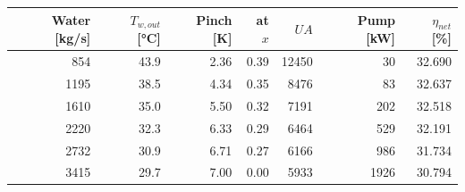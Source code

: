 \begin{tabular}{@{}rrrrrrr@{}}
\toprule
Water [kg/s] & $T_{w,out}$ [\si{\celsius}] & Pinch [K] & at $x$ & $UA$ & Pump [kW] & $\eta_{net}$ [\%] \\
\midrule
854 & 43.9 & 2.36 & 0.39 & 12450 & 30 & 32.690 \\
1195 & 38.5 & 4.34 & 0.35 & 8476 & 83 & 32.637 \\
1610 & 35.0 & 5.50 & 0.32 & 7191 & 202 & 32.518 \\
2220 & 32.3 & 6.33 & 0.29 & 6464 & 529 & 32.191 \\
2732 & 30.9 & 6.71 & 0.27 & 6166 & 986 & 31.734 \\
3415 & 29.7 & 7.00 & 0.00 & 5933 & 1926 & 30.794 \\
\bottomrule
\end{tabular}
